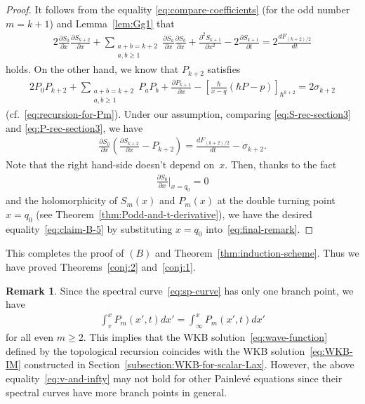 \documentclass[pdftex]{sigma}
\theoremstyle{definition}
\newtheorem{rem}[thm]{Remark}
\numberwithin{equation}{section}
\def\p{\partial}
\begin{document}
\begin{proof}
It follows from
the equality \eqref{eq:compare-coefficients}
(for the odd number $m = k+1$) and Lemma~\ref{lem:Gg1} that
\begin{gather} \label{eq:S-rec-section3}
2 \frac{\p S_{0}}{\p x}\frac{\p S_{k+2}}{\p x} +
\sum_{\substack{a+b=k+2 \\ a, b \ge 1}}
\frac{\p S_{a}}{\p x}\frac{\p S_{b}}{\p x} +
\frac{\p^{2} S_{k+1}}{\p x^{2}}
- 2\frac{\p S_{k+1}}{\p t}
 = 2 \frac{d F_{(k+2)/2}}{dt}
\end{gather}
holds.
On the other hand, we know that $P_{k+2}$ satisf\/ies
\begin{gather} \label{eq:P-rec-section3}
2 P_{0}P_{k+2} +
\sum_{\substack{a+b=k+2 \\ a, b \ge 1}}
P_{a}P_{b} +
\frac{\p P_{k+1}}{\p x} - \left[ \frac{\hbar}{x-q}
\left( \hbar P-p \right) \right]_{\hbar^{k+2}}
 = 2 \sigma_{k+2}
\end{gather}
(cf.~\eqref{eq:recursion-for-Pm}).
Under our assumption, comparing \eqref{eq:S-rec-section3}
and \eqref{eq:P-rec-section3}, we have
\begin{gather} \label{eq:final-remark}
\frac{\p S_{0}}{\p x} \left( \frac{\p S_{k+2}}{\p x} - P_{k+2} \right)
 = \frac{d F_{(k+2)/2}}{dt} - \sigma_{k+2}.
\end{gather}
Note that the right hand-side doesn't depend on~$x$.
Then, thanks to the fact
\begin{gather*}
\frac{\p S_{0}}{\p x} \biggr|_{x=q_{0}}
= 0
\end{gather*}
and the holomorphicity of $S_{m}(x)$ and $P_{m}(x)$
at the double turning point $x = q_0$
(see Theorem~\ref{thm:Podd-and-t-derivative}),
we have the desired equality~\eqref{eq:claim-B-5}
by substituting $x = q_{0}$ into~\eqref{eq:final-remark}.
\end{proof}

This completes the proof of $(B)$ and Theorem~\ref{thm:induction-scheme}.
Thus we have proved Theorems~\ref{conj:2} and~\ref{conj:1}.

\begin{rem}
Since the spectral curve~\eqref{eq:sp-curve} has only
one branch point, we have
\begin{gather} \label{eq:v-and-infty}
\int^{x}_{v}P_{m}(x',t)dx' = \int^{x}_{\infty}P_{m}(x',t)dx'
\end{gather}
for all even $m \ge 2$.
This implies that the WKB solution~\eqref{eq:wave-function}
def\/ined by the topological recursion coincides with
the WKB solution~\eqref{eq:WKB-IM} constructed
in Section~\ref{subsection:WKB-for-scalar-Lax}.
However, the above equality~\eqref{eq:v-and-infty}
may not hold for
other Painlev\'e equations since their spectral curves have
more branch points in general.
\end{rem}
\end{document}
